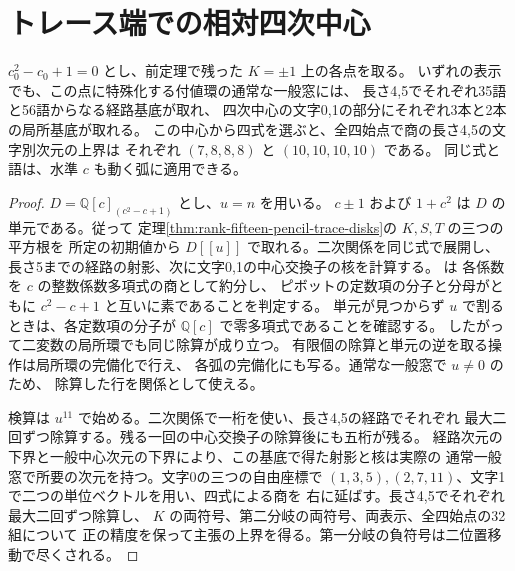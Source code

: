 \section{トレース端での相対四次中心}
\label{sec:rank-fifteen-relative-trace-centers}
\begin{proposition}\label{prop:rank-fifteen-relative-trace-centers}
$c_0^2-c_0+1=0$ とし、前定理で残った $K=\pm1$ 上の各点を取る。
いずれの表示でも、この点に特殊化する付値環の通常な一般窓には、
長さ4,5でそれぞれ35語と56語からなる経路基底が取れ、
四次中心の文字0,1の部分にそれぞれ3本と2本の局所基底が取れる。
この中心から四式を選ぶと、全四始点で商の長さ4,5の文字別次元の上界は
それぞれ $(7,8,8,8)$ と $(10,10,10,10)$ である。
同じ式と語は、水準 $c$ も動く弧に適用できる。
\end{proposition}
\begin{proof}
$D=\mathbb Q[c]_{(c^2-c+1)}$ とし、$u=n$ を用いる。
$c\pm1$ および $1+c^2$ は $D$ の単元である。従って
定理\ref{thm:rank-fifteen-pencil-trace-disks}の $K,S,T$ の三つの平方根を
所定の初期値から $D[[u]]$ で取れる。二次関係を同じ式で展開し、
長さ5までの経路の射影、次に文字0,1の中心交換子の核を計算する。
 は
各係数を $c$ の整数係数多項式の商として約分し、
ピボットの定数項の分子と分母がともに $c^2-c+1$ と互いに素であることを判定する。
単元が見つからず $u$ で割るときは、各定数項の分子が
$\mathbb Q[c]$ で零多項式であることを確認する。
したがって二変数の局所環でも同じ除算が成り立つ。
有限個の除算と単元の逆を取る操作は局所環の完備化で行え、
各弧の完備化にも写る。通常な一般窓で $u\ne0$ のため、
除算した行を関係として使える。

検算は $u^{11}$ で始める。二次関係で一桁を使い、長さ4,5の経路でそれぞれ
最大二回ずつ除算する。残る一回の中心交換子の除算後にも五桁が残る。
経路次元の下界と一般中心次元の下界により、この基底で得た射影と核は実際の
通常一般窓で所要の次元を持つ。文字0の三つの自由座標で
$(1,3,5),(2,7,11)$、文字1で二つの単位ベクトルを用い、四式による商を
右に延ばす。長さ4,5でそれぞれ最大二回ずつ除算し、
$K$ の両符号、第二分岐の両符号、両表示、全四始点の32組について
正の精度を保って主張の上界を得る。第一分岐の負符号は二位置移動で尽くされる。
\end{proof}
